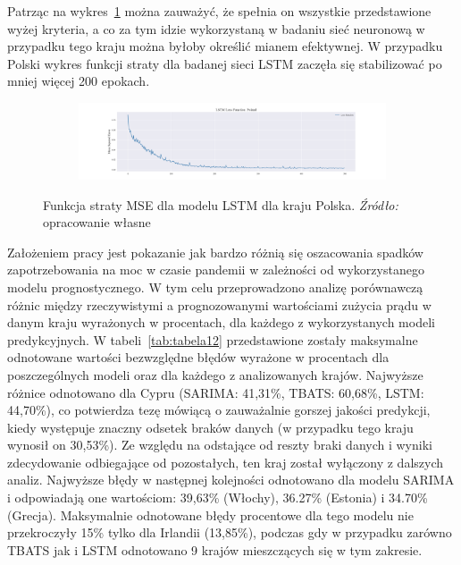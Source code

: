\documentclass[polish, twoside, 12pt, a4paper]{article}
\theoremstyle{definition}
\theoremstyle{plain}
\theoremstyle{remark}
\begin{document}
Patrząc na wykres~\ref{fig:x14} można zauważyć, że spełnia on wszystkie przedstawione wyżej kryteria, a co za tym idzie wykorzystaną w badaniu sieć neuronową w przypadku tego kraju można byłoby określić mianem efektywnej. W przypadku Polski wykres funkcji straty dla badanej sieci LSTM zaczęła się stabilizować po mniej więcej 200 epokach.
\begin{figure}[hbt]
  \centering

  \begin{subfigure}[t]{0.95\textwidth}
    \includegraphics[width=\textwidth]{./out_figures/lstm_loss_function_Poland.png}
  \end{subfigure}

  \captionsetup{margin=10pt,font=small,labelfont=bf,width=.8\textwidth}

  \caption[Funkcja straty MSE dla modelu LSTM dla kraju Polska.]{Funkcja straty MSE dla modelu LSTM dla kraju Polska. \textit{Źródło:} opracowanie własne}\label{fig:x14}
\end{figure}

Założeniem pracy jest pokazanie jak bardzo różnią się oszacowania spadków zapotrzebowania na moc w czasie pandemii w zależności od wykorzystanego modelu prognostycznego. W tym celu przeprowadzono analizę porównawczą różnic między rzeczywistymi a prognozowanymi wartościami zużycia prądu w danym kraju wyrażonych w procentach, dla każdego z wykorzystanych modeli predykcyjnych. W tabeli~\ref{tab:tabela12} przedstawione zostały maksymalne odnotowane wartości bezwzględne błędów wyrażone w procentach dla poszczególnych modeli oraz dla każdego z analizowanych krajów. Najwyższe różnice odnotowano dla Cypru (SARIMA: 41,31\%, TBATS: 60,68\%, LSTM: 44,70\%), co potwierdza tezę mówiącą o zauważalnie gorszej jakości predykcji, kiedy występuje znaczny odsetek braków danych (w przypadku tego kraju wynosił on 30,53\%). Ze względu na odstające od reszty braki danych i wyniki zdecydowanie odbiegające od pozostałych, ten kraj został wyłączony z dalszych analiz. Najwyższe błędy w następnej kolejności odnotowano dla modelu SARIMA i odpowiadają one wartościom: 39,63\% (Włochy), 36.27\% (Estonia) i 34.70\% (Grecja). Maksymalnie odnotowane błędy procentowe dla tego modelu nie przekroczyły 15\% tylko dla Irlandii (13,85\%), podczas gdy w przypadku zarówno TBATS jak i LSTM odnotowano 9 krajów mieszczących się w tym zakresie. 
\end{document}
